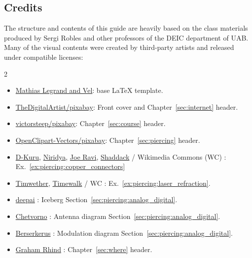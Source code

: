 \subsection*{Credits}

\noindent
The structure and contents of this guide are heavily based on the class materials produced by
Sergi Robles and other professors of the DEIC department of UAB.
Many of the visual contents were created by third-party artists and released under compatible licenses:
\begin{multicols}{2}
\small
\begin{itemize}
\item \href{https://www.overleaf.com/latex/templates/the-legrand-orange-book-template-english/jtctyfmnpppc}{Mathias Legrand and Vel}: base \LaTeX{} template.
\item \href{https://pixabay.com/users/thedigitalartist-202249/}{TheDigitalArtist/pixabay}: Front cover and Chapter~\ref{sec:internet} header.
\item \href{https://pixabay.com/users/victorsteep-9526460/}{victorsteep/pixabay}: Chapter~\ref{sec:course} header.
\item \href{https://pixabay.com/users/openclipart-vectors-30363/}{OpenClipart-Vectors/pixabay}: Chapter~\ref{sec:piercing} header.
\item 
\href{https://en.wikipedia.org/wiki/File:HDMI_connector-male_2_sharp_PNr\%C2\%B00059.jpg}{D-Kuru},
\href{https://commons.wikimedia.org/wiki/File:USB_Type-C_icon.svg}{Niridya},
\href{https://commons.wikimedia.org/wiki/File:N_Connector.jpg}{Joe Ravi},
\href{https://en.wikipedia.org/wiki/File:Photo-RJ11-MF.jpg}{Shaddack}
/ Wikimedia Commons (WC) : Ex.~\ref{ex:piercing:copper_connectors}
\item \href{https://en.wikipedia.org/wiki/File:Laser_in_fibre.jpg}{Timwether}, \href{https://commons.wikimedia.org/wiki/File:MMF_optical.jpg}{Timewalk} / WC : Ex.~\ref{ex:piercing:laser_refraction}.
\item \href{https://deepai.org/machine-learning-model/text2img}{deepai} : Iceberg Section~\ref{sec:piercing:analog_digital}.
\item \href{https://commons.wikimedia.org/wiki/File:Dipole_receiving_antenna_animation_6_300ms.gif}{Chetvorno} : Antenna diagram Section~\ref{sec:piercing:analog_digital}.
\item \href{https://commons.wikimedia.org/wiki/File:Amfm3-en-de.gif}{Berserkerus} : Modulation diagram Section~\ref{sec:piercing:analog_digital}.
\item \href{https://www.pinterest.com/pin/118289927683058369/}{Graham Rhind} : Chapter~\ref{sec:where} header.

\end{itemize}
\end{multicols}
